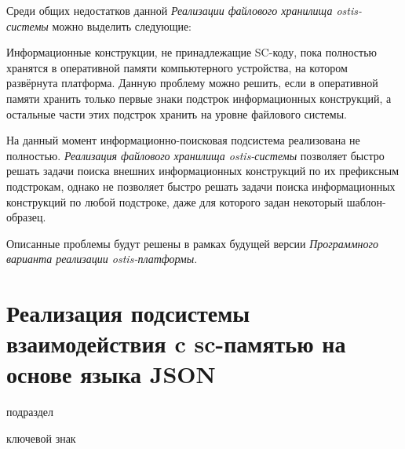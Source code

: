 Среди общих недостатков данной \textit{Реализации файлового хранилища ostis-системы} можно выделить следующие:
\begin{textitemize}
    \item Информационные конструкции, не принадлежащие SC-коду, пока полностью хранятся в оперативной памяти компьютерного устройства, на котором развёрнута платформа. Данную проблему можно решить, если в оперативной памяти хранить только первые знаки подстрок информационных конструкций, а остальные части этих подстрок хранить на уровне файлового системы.
    \item На данный момент информационно-поисковая подсистема реализована не полностью. \textit{Реализация файлового хранилища ostis-системы} позволяет быстро решать задачи поиска внешних информационных конструкций по их префиксным подстрокам, однако не позволяет быстро решать задачи поиска информационных конструкций по любой подстроке, даже для которого задан некоторый шаблон-образец.
\end{textitemize}

Описанные проблемы будут решены в рамках будущей версии \textit{Программного варианта реализации ostis-платформы}.

\section{Реализация подсистемы взаимодействия c sc-памятью на основе языка JSON}
\label{sec_soft_platform_sc_server_subsystem}

\begin{SCn}

\begin{scnrelfromlist}{подраздел}
\end{scnrelfromlist}

\begin{scnrelfromlist}{ключевой знак}
\end{scnrelfromlist}

\end{SCn}

